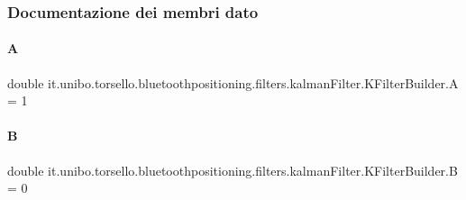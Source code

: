 \subsubsection{Documentazione dei membri dato}
\hypertarget{classit_1_1unibo_1_1torsello_1_1bluetoothpositioning_1_1filters_1_1kalmanFilter_1_1KFilterBuilder_ad93db15bf28d834081e9fb3df0daad9a_ad93db15bf28d834081e9fb3df0daad9a}{}\label{classit_1_1unibo_1_1torsello_1_1bluetoothpositioning_1_1filters_1_1kalmanFilter_1_1KFilterBuilder_ad93db15bf28d834081e9fb3df0daad9a_ad93db15bf28d834081e9fb3df0daad9a} 
\paragraph{\texorpdfstring{A}{A}}
{\footnotesize\ttfamily double it.\+unibo.\+torsello.\+bluetoothpositioning.\+filters.\+kalman\+Filter.\+K\+Filter\+Builder.\+A = 1\hspace{0.3cm}{\ttfamily [private]}}

\hypertarget{classit_1_1unibo_1_1torsello_1_1bluetoothpositioning_1_1filters_1_1kalmanFilter_1_1KFilterBuilder_a34d29c926b790a773f8f74bfd72e1f56_a34d29c926b790a773f8f74bfd72e1f56}{}\label{classit_1_1unibo_1_1torsello_1_1bluetoothpositioning_1_1filters_1_1kalmanFilter_1_1KFilterBuilder_a34d29c926b790a773f8f74bfd72e1f56_a34d29c926b790a773f8f74bfd72e1f56} 
\paragraph{\texorpdfstring{B}{B}}
{\footnotesize\ttfamily double it.\+unibo.\+torsello.\+bluetoothpositioning.\+filters.\+kalman\+Filter.\+K\+Filter\+Builder.\+B = 0\hspace{0.3cm}{\ttfamily [private]}}

